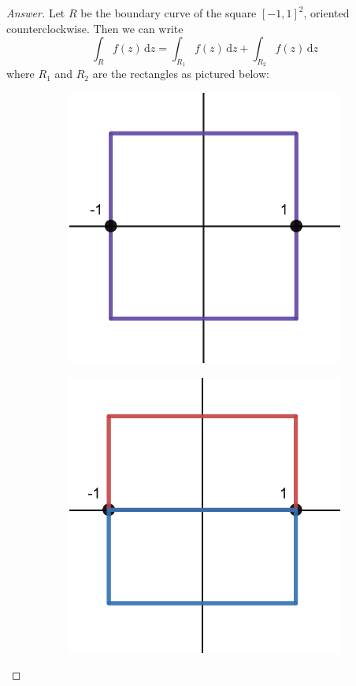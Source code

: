 \documentclass[12pt]{article}
\renewcommand{\i}[4]{\int_{#1}^{#2} {#3} \, \mathrm{d} {#4} }
\theoremstyle{definition}
\begin{document}
\begin{proof}[Answer]
    Let $R$ be the boundary curve of the square $[-1,1]^2$, oriented counterclockwise. Then we can write 
    \[
        \i{R}{}{f(z)}{z} = \i{R_1}{}{f(z)}{z} + \i{R_2}{}{f(z)}{z}
    \]
    where $R_1$ and $R_2$ are the rectangles as pictured below:
    \begin{figure}[H]
        \centering
        \begin{subfigure}{0.45\textwidth}
            \centering
            \includegraphics[width=\textwidth]{12a.png}
            \label{fig:12a}
        \end{subfigure}
        \hfill
        \begin{subfigure}{0.45\textwidth}
            \centering
            \includegraphics[width=\textwidth]{12b.png}

\end{subfigure}
\end{figure}
\end{proof}
\end{document}
